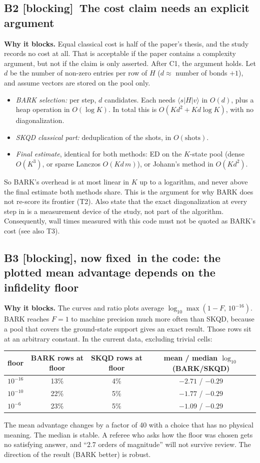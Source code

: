 \documentclass[11pt,a4paper]{article}
\newcommand{\code}[1]{\texttt{\detokenize{#1}}}
\newcommand{\sev}[1]{\textsf{\small[#1]}}
\newcommand{\blocking}{\textcolor{block}{\sev{blocking}}}
\newcommand{\fixed}{\textcolor{done}{\textsf{\small fixed}}}
\begin{document}
\subsection*{B2 \blocking\ The cost claim needs an explicit argument}
\textbf{Why it blocks.} Equal classical cost is half of the paper's thesis, and
the study records no cost at all. That is acceptable if the paper contains a
complexity argument, but not if the claim is only asserted. After C1, the
argument holds. Let $d$ be the number of non-zero entries per row of $H$
($d\approx$ number of bonds $+1$), and assume vectors are stored on the pool only.
\begin{itemize}[noitemsep]
  \item \emph{BARK selection:} per step, $d$ candidates. Each needs
    $\langle s|H|v\rangle$ in $O(d)$, plus a heap operation in $O(\log K)$.
    In total this is $O(K d^2 + K d\log K)$, with no diagonalization.
  \item \emph{SKQD classical part:} deduplication of the shots, in $O(\text{shots})$.
  \item \emph{Final estimate}, identical for both methods: ED on the $K$-state pool (dense $O(K^3)$,
    or sparse Lanczos $O(K d\, m)$), or Johann's method in $O(Kd^2)$.
\end{itemize}
So BARK's overhead is at most linear in $K$ up to a logarithm, and never above
the final estimate both methods share. This is the argument for why BARK does
not re-score its frontier (T2). Also state that the exact diagonalization at every step in
\code{full_bark_run} is a measurement device of the study, not part of the
algorithm. Consequently, wall times measured with this code must not be quoted as
BARK's cost (see also T3).

\subsection*{B3 \blocking, now \fixed\ in the code: the plotted mean advantage depends on the infidelity floor}
\textbf{Why it blocks.} The curves and ratio plots average
$\log_{10}\max(1-F,\,10^{-16})$. BARK reaches $F=1$ to machine precision much
more often than SKQD, because a pool that covers the ground-state support gives an exact result.
Those rows sit at an arbitrary constant. In the current data, excluding trivial cells:
\begin{center}\small
\begin{tabular}{lccc}\toprule
floor & BARK rows at floor & SKQD rows at floor & mean / median $\log_{10}$(BARK/SKQD)\\\midrule
$10^{-16}$ & 13\% & 4\% & $-2.71$ / $-0.29$\\
$10^{-10}$ & 22\% & 5\% & $-1.77$ / $-0.29$\\
$10^{-6}$ & 23\% & 5\% & $-1.09$ / $-0.29$\\\bottomrule
\end{tabular}
\end{center}
The mean advantage changes by a factor of 40 with a choice that has no physical
meaning. The median is stable. A referee who asks how the floor was chosen gets
no satisfying answer, and ``2.7 orders of magnitude'' will not survive review.
The direction of the result (BARK better) is robust.
\end{document}
